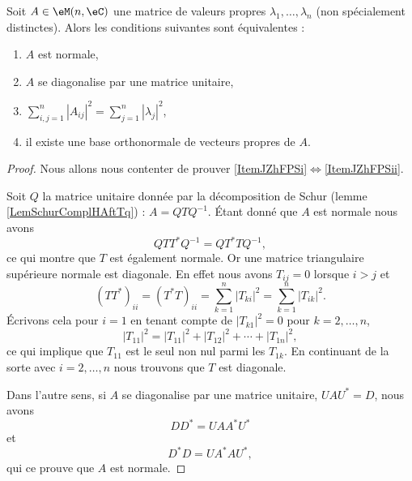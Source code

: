\begin{theorem}    \label{ThogammwA}
    Soit \( A\in\eM(n,\eC)\) une matrice de valeurs propres \( \lambda_1,\ldots, \lambda_n\) (non spécialement distinctes). Alors les conditions suivantes sont équivalentes :
    \begin{enumerate}
        \item   \label{ItemJZhFPSi}
            \( A\) est normale,
        \item   \label{ItemJZhFPSii}
            \( A\) se diagonalise par une matrice unitaire,
        \item
            \( \sum_{i,j=1}^n| A_{ij} |^2=\sum_{j=1}^n| \lambda_j |^2\),
        \item
            il existe une base orthonormale de vecteurs propres de \( A\).
    \end{enumerate}
\end{theorem}

\begin{proof}
    Nous allons nous contenter de prouver \ref{ItemJZhFPSi}\( \Leftrightarrow\)\ref{ItemJZhFPSii}.

    Soit \( Q\) la matrice unitaire donnée par la décomposition de Schur (lemme \ref{LemSchurComplHAftTq}) : \( A=QTQ^{-1}\). Étant donné que \( A\) est normale nous avons
    \begin{equation}
        QTT^*Q^{-1}=QT^*TQ^{-1},
    \end{equation}
    ce qui montre que \( T\) est également normale. Or une matrice triangulaire supérieure normale est diagonale. En effet nous avons \( T_{ij}=0\) lorsque \( i>j\) et
    \begin{equation}
        (TT^*)_{ii}=(T^*T)_{ii}=\sum_{k=1}^n| T_{ki} |^2=\sum_{k=1}^n| T_{ik} |^2.
    \end{equation}
    Écrivons cela pour \( i=1\) en tenant compte de \( | T_{k1} |^2=0\) pour \( k=2,\ldots, n\),
    \begin{equation}
        | T_{11} |^2=| T_{11} |^2+| T_{12} |^2+\cdots+| T_{1n} |^2,
    \end{equation}
    ce qui implique que \( T_{11}\) est le seul non nul parmi les \( T_{1k}\). En continuant de la sorte avec \( i=2,\ldots, n\) nous trouvons que \( T\) est diagonale.

    Dans l'autre sens, si \( A\) se diagonalise par une matrice unitaire, \( UAU^*=D\), nous avons
    \begin{equation}
        DD^*=UAA^*U^*
    \end{equation}
    et 
    \begin{equation}
        D^*D=UA^*AU^*,
    \end{equation}
    qui ce prouve que \( A\) est normale.
\end{proof}

